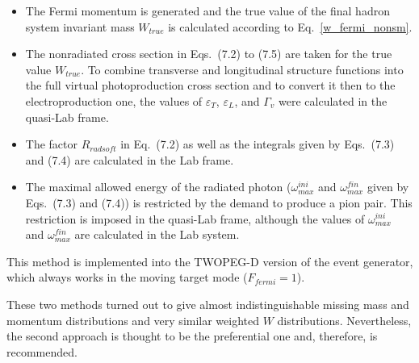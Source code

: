 \begin{itemize}

\item The Fermi momentum is generated and the true value of the final hadron system invariant mass $W_{true}$ is calculated according to Eq.~\eqref{w_fermi_nonsm}.

\item The nonradiated cross section in Eqs.~(7.2) to (7.5) are taken for the true value $W_{true}$. To combine transverse and longitudinal structure functions into the full virtual photoproduction cross section and to convert it then to the electroproduction one, the values of $\varepsilon_{T}$, $\varepsilon_{L}$, and $\Gamma_{v}$ were calculated in the quasi-Lab frame.


\item The factor $R_{radsoft}$ in Eq.~(7.2) as well as the integrals given by Eqs.~(7.3) and (7.4) are calculated in the Lab frame. 

\item The maximal allowed energy of the radiated photon ($\omega_{max}^{ini}$ and $\omega_{max}^{fin}$ given by Eqs.~(7.3) and (7.4)) is restricted by the demand to produce a pion pair. This restriction is imposed in the quasi-Lab frame, although the values of $\omega_{max}^{ini}$ and $\omega_{max}^{fin}$ are calculated in the Lab system.


\end{itemize}


This method is implemented into the TWOPEG-D version of the event generator, which always works in the moving target mode ($F_{fermi}=1$).

These two methods turned out to give almost indistinguishable missing mass and momentum distributions and very similar weighted $W$ distributions.
Nevertheless, the second approach is thought to be the preferential one and, therefore, is recommended. 

